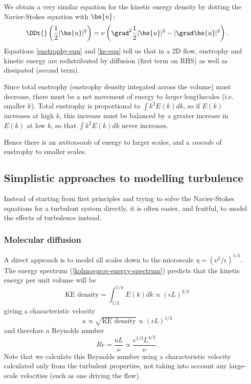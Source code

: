 We obtain a very similar equation for the kinetic energy density by dotting the
Navier-Stokes equation with $\bs{u}$:
\begin{equation}
    \DDt{}\left(\frac{1}{2}|\bs{u}|^2\right) 
    = \nu\left(\grad^2\frac{1}{2}|\bs{u}|^2 - |\grad\bs{u}|^2\right).
 \label{ke-eqn}
\end{equation}
Equations \ref{enstrophy-eqn} and \ref{ke-eqn} tell us that in a 2D flow,
enstrophy and kinetic energy are redistributed by diffusion (first term on RHS)
as well as dissipated (second term).

Since total enstrophy (enstrophy density integated across the volume) must
decrease, there must be a net movement of energy to \textit{larger} lengthscales
(i.e.  smaller $k$). Total enstrophy is proportional to $\int k^2E(k) dk$, so if
$E(k)$ increases at high $k$, this increase must be balanced by a greater
increase in $E(k)$ at low $k$, so that $\int k^2E(k) dk$ never increases.

Hence there is an \textit{anticascade} of energy to larger scales, and a
\textit{cascade} of enstrophy to smaller scales.

\subsection{Simplistic approaches to modelling turbulence}

Instead of starting from first principles and trying to solve the Navier-Stokes
equations for a turbulent system directly, it is often easier, and fruitful, to
model the effects of turbulence instead.

\subsubsection{Molecular diffusion}

A direct approach is to model all scales down to the microscale
$\eta=(\nu^3/\epsilon)^{1/4}$. The energy spectrum
(\ref{kolmogorov-energy-spectrum}) predicts that the kinetic energy 
per unit volume will be 
\begin{equation}
    \text{KE density} = \int_{1/L}^{1/\eta} E(k) dk \propto (\epsilon L)^{2/3}
\end{equation}
giving a characteristic velocity
\begin{equation}
    u \propto \sqrt{\text{KE density}} \propto (\epsilon L)^{1/3}
\end{equation}
and therefore a Reynolds number
\begin{equation}
    Re = \frac{uL}{\nu} \propto \frac{\epsilon^{1/3} L^{4/3}}{\nu}.
\end{equation}
Note that we calculate this Reynolds number using a characteristic velocity
calculated only from the turbulent properties, not taking into account any
large-scale velocities (such as one driving the flow). 

